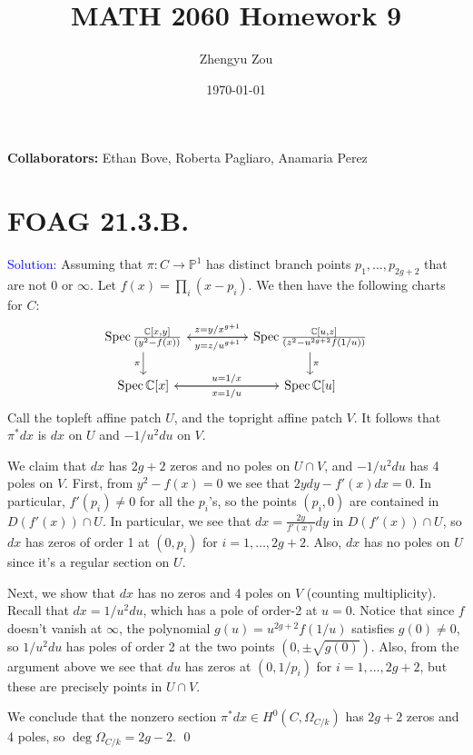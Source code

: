\documentclass[11pt]{article}
\title{MATH 2060 Homework 9}
\author{Zhengyu Zou}
\date{\today}
\newcommand{\CC}{\mathbb{C}}
\newcommand{\PP}{\mathbb{P}}
\DeclareMathOperator{\Spec}{\operatorname{Spec}}
\newenvironment{solution}{\begin{trivlist}\item[]{\textcolor{blue}{Solution:}}}{\qed \end{trivlist}}
\begin{document}
\maketitle

\textbf{Collaborators:} Ethan Bove, Roberta Pagliaro, Anamaria Perez

\section*{FOAG 21.3.B.}

\begin{solution}
    Assuming that $\pi: C \rightarrow \PP^1$ has distinct branch points $p_1, \ldots, p_{2g+2}$ that are not $0$ or $\infty$. Let $f(x) = \prod_i (x - p_i)$. We then have the following charts for $C$: 
    \[\begin{tikzcd}
        {\Spec \frac{\CC[x,y]}{(y^2 - f(x))}} && {\Spec \frac{\CC[u,z]}{(z^2 - u^{2g+2}f(1/u))}} \\
        {\Spec \CC[x]} && {\Spec \CC[u]}
        \arrow["{z = y / x^{g+1}}", from=1-1, to=1-3]
        \arrow["\pi"', from=1-1, to=2-1]
        \arrow["{y = z / u^{g+1}}", from=1-3, to=1-1]
        \arrow["\pi", from=1-3, to=2-3]
        \arrow["{u = 1/x}", from=2-1, to=2-3]
        \arrow["{x = 1/u}", from=2-3, to=2-1]
    \end{tikzcd}\]
    Call the topleft affine patch $U$, and the topright affine patch $V$. It follows that $\pi^*dx$ is $dx$ on $U$ and $-1/u^2 du$ on $V$. 
    
    We claim that $dx$ has $2g + 2$ zeros and no poles on $U \cap V$, and $-1/u^2 du$ has 4 poles on $V$. First, from $y^2 - f(x) = 0$ we see that $2ydy - f'(x) dx = 0$. In particular, $f'(p_i) \neq 0$ for all the $p_i$'s, so the points $(p_i, 0)$ are contained in $D(f'(x)) \cap U$. In particular, we see that $dx = \frac{2y}{f'(x)} dy$ in $D(f'(x)) \cap U$, so $dx$ has zeros of order 1 at $(0, p_i)$ for $i = 1, \ldots, 2g+2$. Also, $dx$ has no poles on $U$ since it's a regular section on $U$. 

    Next, we show that $dx$ has no zeros and 4 poles on $V$ (counting multiplicity). Recall that $dx = 1/u^2 du$, which has a pole of order-2 at $u = 0$. Notice that since $f$ doesn't vanish at $\infty$, the polynomial $g(u) = u^{2g+2} f(1/u)$ satisfies $g(0) \neq 0$, so $1/u^2 du$ has poles of order 2 at the two points $(0, \pm \sqrt{g(0)})$. Also, from the argument above we see that $du$ has zeros at $(0, 1/p_i)$ for $i = 1, \ldots, 2g+2$, but these are precisely points in $U \cap V$. 
    
    We conclude that the nonzero section $\pi^* dx \in H^0(C, \Omega_{C/k})$ has $2g + 2$ zeros and 4 poles, so $\deg \Omega_{C/k} = 2g - 2$. 
\end{solution}
\end{document}
